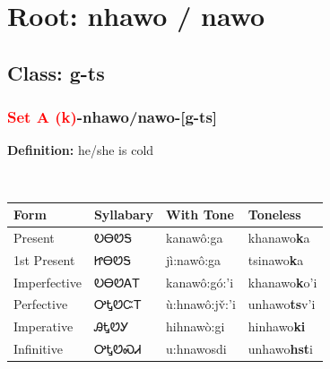 \needspace{4in}
\section*{Root: nhawo / nawo}
\nopagebreak
{}
\needspace{3in}
\subsection*{Class: g-ts}
\nopagebreak
\needspace{2in}
\subsubsection*{\textcolor{Red}{Set A (k)}{-}\textbf{nhawo/nawo}{-}[g-ts]}
\nopagebreak
\textbf{Definition: } he/she is cold
\\[0.5em]
\begin{tabularx}{\textwidth}{l X X X}%
\toprule%
\textbf{Form}&\textbf{Syllabary}&\textbf{With Tone}&\textbf{Toneless}\\%
\midrule%
Present&ᎧᎾᏬᎦ&kanawô:ga&khanawo\textbf{k}a\\%
1st Present&ᏥᎾᏬᎦ&jì:nawô:ga&tsinawo\textbf{k}a\\%
Imperfective&ᎧᎾᏬᎪᎢ&kanawô:gó:’i&khanawo\textbf{k}o'i\\%
Perfective&ᎤᎿᏬᏨᎢ&ù:hnawô:jv̌:’i&unhawo\textbf{ts}v'i\\%
Imperative&ᎯᎿᏬᎩ&hihnawò:gi&hinhawo\textbf{ki}\\%
Infinitive&ᎤᎿᏬᏍᏗ&u:hnawosdi&unhawo\textbf{hst}i\\%
\bottomrule%
\end{tabularx}
\\[1em]